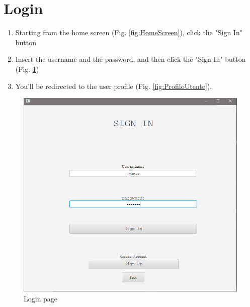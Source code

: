 \documentclass[11pt]{report}
\begin{document}
\section{Login}
\begin{enumerate}
    \item Starting from the home screen (Fig. \ref{fig:HomeScreen}), click the "Sign In" button
    \item Insert the username and the password, and then click the "Sign In" button (Fig. \ref{fig:LoginUtente1})
    \item You'll be redirected to the user profile (Fig. \ref{fig:ProfiloUtente}).
\end{enumerate}
\begin{figure}[H]
  \centering
  \includegraphics[width=\textwidth,keepaspectratio=true]{img/user_manual/LoginUtente1.png}
  \caption{Login page}
  \label{fig:LoginUtente1}
\end{figure}
\end{document}
